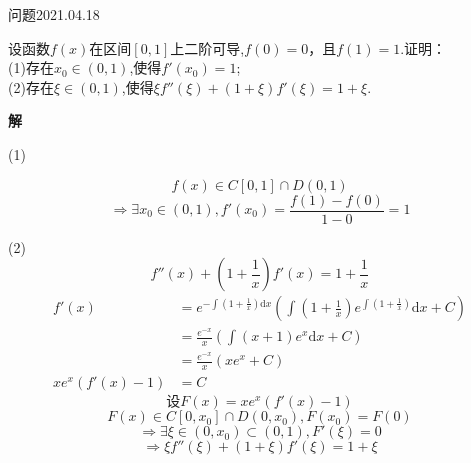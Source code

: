 \begin{mybox}{问题2021.04.18}
	
	\qquad 设函数$f(x)$在区间$[0,1]$上二阶可导,$f(0)=0$，且$f(1)=1$.证明：\\
	(1)存在$x_0 \in (0,1)$,使得$f'(x_0)=1$;\\
	(2)存在$\xi \in(0,1)$,使得$\xi f''(\xi)+(1+\xi)f'(\xi)=1+\xi$.
\end{mybox}
\noindent
\textbf{解}

\noindent
(1)

$$f(x)\in C[0,1]\cap D(0,1)$$
$$\Rightarrow \exists x_0 \in (0,1),f'(x_0)=\frac{f(1)-f(0)}{1-0}=1$$

\noindent
(2)
$$f''(x)+(1+\frac{1}{x})f'(x)=1+\frac{1}{x}$$
\begin{align*}
	f'(x)&=e^{-\int (1+\frac{1}{x})\mathrm{d}x}(\int (1+\frac{1}{x})e^{\int (1+\frac{1}{x})}\mathrm{d}x+C)\\
	&=\frac{e^{-x}}{x}(\int (x+1)e^x\mathrm{d}x+C )\\
	&=\frac{e^{-x}}{x}(xe^x +C)\\
	xe^x(f'(x)-1)&=C
\end{align*}
$$\text{设}F(x)=xe^x(f'(x)-1)$$
$$F(x)\in C[0,x_0]\cap D(0,x_0),F(x_0)=F(0)$$
$$\Rightarrow \exists \xi \in(0,x_0)\subset (0,1),F'(\xi)=0$$
$$\Rightarrow \xi f''(\xi)+(1+\xi)f'(\xi)=1+\xi$$